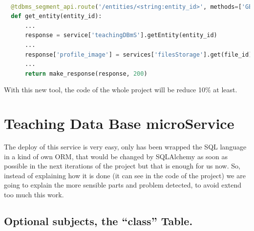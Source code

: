 \begin{lstlisting}[language=python,frame=none]

  @tdbms_segment_api.route('/entities/<string:entity_id>', methods=['GET'])
  def get_entity(entity_id):
      ...
      response = service['teachingDBmS'].getEntity(entity_id)
      ...
      response['profile_image'] = services['filesStorage'].get(file_id)
      ...
      return make_response(response, 200)
\end{lstlisting}

\noindent With this new tool, the code of the whole project will be reduce 10\% at least.

\section{Teaching Data Base microService}

The deploy of this service is very easy, only has been wrapped the SQL language
in a kind of own ORM, that would be changed by SQLAlchemy as soon as possible in
the next iterations of the project but that is enough for us now. So, instead of
explaining how it is done (it can see in the code of the project) we are going to
explain the more sensible parts and problem detected, to avoid extend too much this
 work.

\subsection{Optional subjects, the ``class'' Table.}

